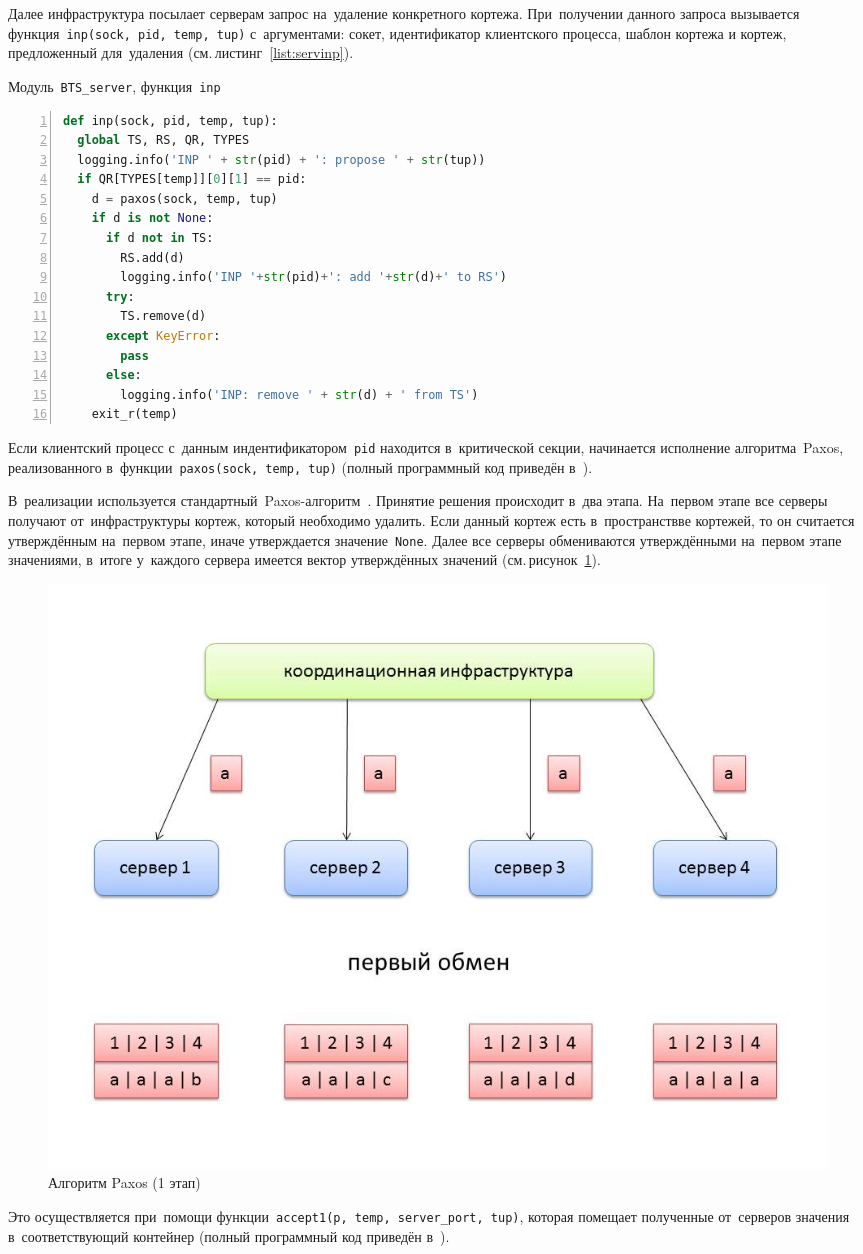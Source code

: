 Далее инфраструктура посылает серверам запрос на~удаление конкретного кортежа. При~получении данного запроса вызывается функция~\texttt{inp(sock, pid, temp, tup)} с~аргументами: сокет, идентификатор клиентского процесса, шаблон кортежа и кортеж, предложенный для~удаления (см.\,листинг~\ref{list:servinp}).
\begin{ListingEnv}\caption{Модуль~\texttt{BTS\_server}, функция~\texttt{inp}}\label{list:servinp}
	\begin{lstlisting}[language=Python, numbers=left]
def inp(sock, pid, temp, tup):
  global TS, RS, QR, TYPES
  logging.info('INP ' + str(pid) + ': propose ' + str(tup))
  if QR[TYPES[temp]][0][1] == pid:
    d = paxos(sock, temp, tup)
    if d is not None:
      if d not in TS:
        RS.add(d)
        logging.info('INP '+str(pid)+': add '+str(d)+' to RS')
      try:
        TS.remove(d)
      except KeyError:
        pass
      else:
        logging.info('INP: remove ' + str(d) + ' from TS')
    exit_r(temp)
	\end{lstlisting}
\end{ListingEnv}

Если клиентский процесс с~данным индентификатором~\texttt{pid} находится в~критической секции, начинается исполнение алгоритма~Paxos, реализованного в~функции~\texttt{paxos(sock, temp, tup)} (полный программный код приведён в~\autocite{mybts}).

В~реализации используется стандартный~Paxos-алгоритм~\autocite{paxos2}. Принятие решения происходит в~два этапа. На~первом этапе все серверы получают от~инфраструктуры кортеж, который необходимо удалить. Если данный кортеж есть в~пространствве кортежей, то он считается утверждённым на~первом этапе, иначе утверждается значение~\texttt{None}. Далее все серверы обмениваются утверждёнными на~первом этапе значениями, в~итоге у~каждого сервера имеется вектор утверждённых значений (см.\,рисунок~\ref{paxosjpg1}).
\begin{figure}
	\centering \includegraphics[width=0.8 \textwidth, height=0.6 \textwidth]{img/paxos1}  \caption{Алгоритм Paxos (1 этап)} \label{paxosjpg1}
\end{figure}
Это осуществляется при~помощи функции~\texttt{accept1(p, temp, server_port, tup)}, которая помещает полученные от~серверов значения в~соответствующий контейнер (полный программный код приведён в~\autocite{mybts}). 

